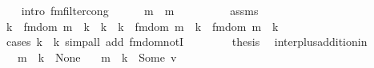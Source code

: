 \begin{isabellebody}
\ \ \isamarkupfalse%
\ {\isacharparenleft}{\kern0pt}intro\ fmfilter{\isacharunderscore}{\kern0pt}cong{\isacharprime}{\kern0pt}{\isacharparenright}{\kern0pt}\isanewline
\ \ \ \ \isamarkupfalse%
\ {\isachardoublequoteopen}m\ {\isacharequal}{\kern0pt}\ m\ \isacommand{{\isachardot}{\kern0pt}{\isachardot}{\kern0pt}}\isamarkupfalse%
\isanewline
\ \ \isamarkupfalse%
\isanewline
\ \ \ \ \isamarkupfalse%
\ assms\ \isamarkupfalse%
\ {\isachardoublequoteopen}k{\isacharprime}{\kern0pt}\ {\isasymin}\ fmdom{\isacharprime}{\kern0pt}\ m\ {\isasymLongrightarrow}\ {\isacharparenleft}{\kern0pt}k{\isacharprime}{\kern0pt}\ {\isacharequal}{\kern0pt}\ k\ {\isasymor}\ k{\isacharprime}{\kern0pt}\ {\isasymin}\ fmdom{\isacharprime}{\kern0pt}\ m\ {\isacharequal}{\kern0pt}\ {\isacharparenleft}{\kern0pt}k{\isacharprime}{\kern0pt}\ {\isasymin}\ fmdom{\isacharprime}{\kern0pt}\ m\ \ k{\isacharprime}{\kern0pt}\isanewline
\ \ \ \ \isamarkupfalse%
\ {\isacharparenleft}{\kern0pt}cases\ {\isachardoublequoteopen}k{\isacharprime}{\kern0pt}\ {\isacharequal}{\kern0pt}\ k{\isachardoublequoteclose}{\isacharparenright}{\kern0pt}\ {\isacharparenleft}{\kern0pt}simp{\isacharunderscore}{\kern0pt}all\ add{\isacharcolon}{\kern0pt}\ fmdom{\isacharprime}{\kern0pt}{\isacharunderscore}{\kern0pt}notI{\isacharparenright}{\kern0pt}\isanewline
\ \ \isamarkupfalse%
\isanewline
\ \ \isamarkupfalse%
\ \isamarkupfalse%
\ {\isacharquery}{\kern0pt}thesis\ \isacommand{{\isachardot}{\kern0pt}}\isamarkupfalse%
\isanewline
{}\isamarkupfalse%
%
\endisatagproof
{\isafoldproof}%
%
\isadelimproof
\isanewline
%
\endisadelimproof
\isanewline
{}\isamarkupfalse%
\ inter{\isacharunderscore}{\kern0pt}plus{\isacharunderscore}{\kern0pt}addition{\isacharunderscore}{\kern0pt}in{\isacharcolon}{\kern0pt}\isanewline
\ \ \ {\isachardoublequoteopen}m\ {\isachardollar}{\kern0pt}{\isachardollar}{\kern0pt}\ k\ {\isacharequal}{\kern0pt}\ None{\isachardoublequoteclose}\isanewline
\ \ \ {\isachardoublequoteopen}m\ {\isachardollar}{\kern0pt}{\isachardollar}{\kern0pt}\ k\ {\isacharequal}{\kern0pt}\ Some\ v{\isacharprime}{\kern0pt}{\isachardoublequoteclose}\isanewline

\end{isabellebody}
